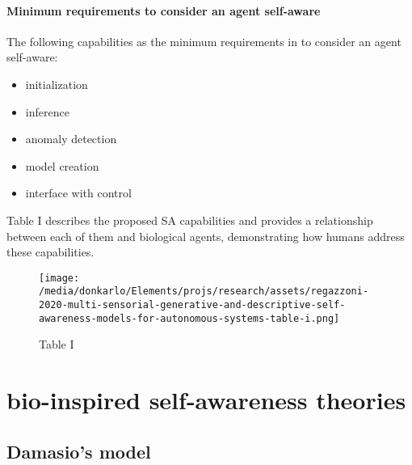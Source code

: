 \documentclass{article}
\begin{document}
		\paragraph{Minimum requirements to consider an agent self-aware}The following capabilities as the minimum requirements in to consider an agent self-aware: 
		\begin{itemize}
			\item initialization
			\item inference
			\item anomaly detection
			\item model creation
			\item interface with control
		\end{itemize}
		\citet{regazzoni-2020-multi-sensorial-generative-and-descriptive-self-awareness-models-for-autonomous-systems} Table I describes the proposed SA capabilities and provides a relationship between each of them and biological agents, demonstrating how humans address these capabilities.
		\begin{figure*}
			\centering
			\texttt{[image: /media/donkarlo/Elements/projs/research/assets/regazzoni-2020-multi-sensorial-generative-and-descriptive-self-awareness-models-for-autonomous-systems-table-i.png]}
			\caption{Table I}
			\label{fig:regazzoni-2020-multi-sensorial-generative-and-descriptive-self-awareness-models-for-autonomous-systems-table-i.jpg}
		\end{figure*}
	\section{bio-inspired self-awareness theories}
		\subsection{Damasio’s model}
\end{document}
